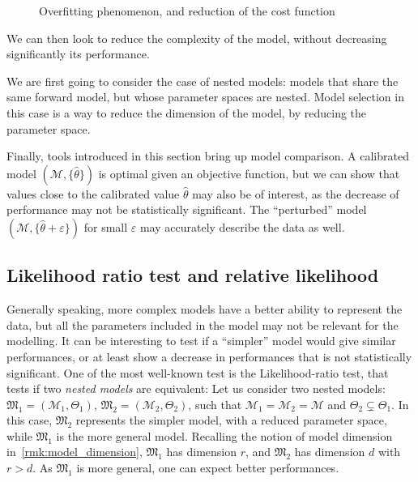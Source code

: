 \documentclass[../../Main_ManuscritThese.tex]{subfiles}
\newcommand\imgpath{/home/victor/acadwriting/Manuscrit/Text/Chapter2/img/}
\begin{document}
\begin{figure}[ht]
  \centering
  
  \caption{\label{fig:overfitting} Overfitting phenomenon, and reduction of the cost function}
\end{figure}


We can then look to reduce the complexity of the model, without decreasing significantly its performance.

We are first going to consider the case of nested models: models that share the same forward model, but whose parameter spaces are nested. Model selection in this case is a way to reduce the dimension of the model, by reducing the parameter space.

Finally, tools introduced in this section bring up model comparison. A calibrated model $(\mathcal{M},\{\hat{\theta}\})$ is optimal given an objective function, but we can show that values close to the calibrated value $\hat{\theta}$ may also be of interest, as the decrease of performance may not be statistically significant. The ``perturbed'' model $(\mathcal{M}, \{\hat{\theta} + \varepsilon\})$ for small $\varepsilon$ may accurately describe the data as well.

\subsection{Likelihood ratio test and relative likelihood}
\label{sec:likelihood_ratio_test}
Generally speaking, more complex models have a better ability to represent the data, but all the parameters included in the model may not be relevant for the modelling. It can be interesting to test if a ``simpler'' model would give similar performances, or at least show a decrease in performances that is not statistically significant.
One of the most well-known test is the Likelihood-ratio test, that tests if two \emph{nested models} are equivalent:
Let us consider two nested models: $\mathfrak{M}_1 = (\mathcal{M}_1, \Theta_1)$, $\mathfrak{M}_2= (\mathcal{M}_2,\Theta_2)$, such that $\mathcal{M}_1=\mathcal{M}_2=\mathcal{M}$ and $\Theta_2 \subsetneq \Theta_1$. In this case, $\mathfrak{M}_2$ represents the simpler model, with a reduced parameter space, while $\mathfrak{M}_1$ is the more general model. Recalling the notion of model dimension in~\cref{rmk:model_dimension},  $\mathfrak{M}_1$ has dimension $r$, and $\mathfrak{M}_2$ has dimension $d$ with $r>d$.
As $\mathfrak{M}_1$ is more general, one can expect better performances.
\end{document}
